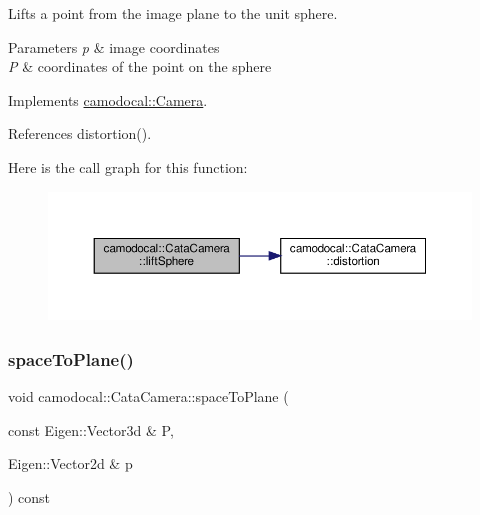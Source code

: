 Lifts a point from the image plane to the unit sphere. 


\begin{DoxyParams}{Parameters}
{\em p} & image coordinates \\
\hline
{\em P} & coordinates of the point on the sphere \\
\hline
\end{DoxyParams}


Implements \hyperlink{classcamodocal_1_1Camera_a77b4ea673c694741302efba6f86a0100}{camodocal\+::\+Camera}.



References distortion().

Here is the call graph for this function\+:\nopagebreak
\begin{figure}[H]
\begin{center}
\leavevmode
\includegraphics[width=350pt]{classcamodocal_1_1CataCamera_ad408a25dbeabac661788d16357b44504_cgraph}
\end{center}
\end{figure}
\mbox{\label{classcamodocal_1_1CataCamera_ab705d867d93d87c85d755bb7b1022a2c}} 
\subsubsection{\texorpdfstring{space\+To\+Plane()}{spaceToPlane()}}
{\footnotesize\ttfamily void camodocal\+::\+Cata\+Camera\+::space\+To\+Plane (\begin{DoxyParamCaption}\item[{const Eigen\+::\+Vector3d \&}]{P,  }\item[{Eigen\+::\+Vector2d \&}]{p }\end{DoxyParamCaption}) const\hspace{0.3cm}{\ttfamily [virtual]}}



